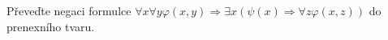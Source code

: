 Převeďte negaci formulce $\forall x \forall y \varphi(x,y) \Rightarrow \exists x
(\psi(x) \Rightarrow \forall z \varphi(x,z))$ do prenexního tvaru.
